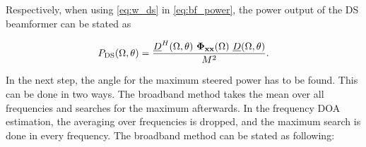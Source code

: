 Respectively, when using \ref{eq:w_ds} in \ref{eq:bf_power}, the power output of the \ac{DS} beamformer can be stated as

\begin{equation}
P_\text{DS}(\Omega,\theta) = \frac{\underline{D}^H(\Omega, \theta)\ \mathbf{\Phi_{xx}}(\Omega)\ \underline{D}(\Omega, \theta)}{M^2}.
\label{eq:p_ds}
\end{equation}

In the next step, the angle for the maximum steered power has to be found. This
can be done in two ways. The broadband method takes the mean over all frequencies and searches for the maximum afterwards. In the frequency \ac{DOA} estimation, the averaging over frequencies is dropped, and the maximum search is done  in every frequency.
The broadband method can be stated as following:

